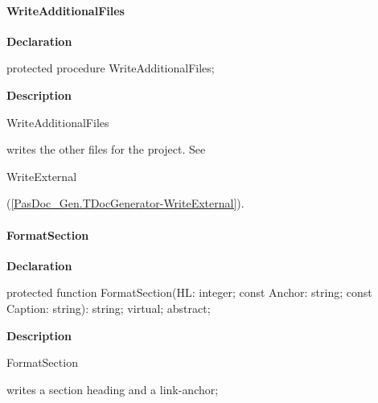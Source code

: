 \documentclass{report}
\newif\ifpdf
\begin{document}
\paragraph*{WriteAdditionalFiles}\hspace*{\fill}

\label{PasDoc_Gen.TDocGenerator-WriteAdditionalFiles}
\begin{list}{}{
\setlength{\itemindent}{0cm}
\setlength{\listparindent}{0cm}
\setlength{\leftmargin}{\evensidemargin}
\addtolength{\leftmargin}{\tmplength}
\settowidth{\labelsep}{X}
\addtolength{\leftmargin}{\labelsep}
\setlength{\labelwidth}{\tmplength}
}
\item[\textbf{Declaration}\hfill]
\ifpdf
\begin{flushleft}
\fi
\begin{ttfamily}
protected procedure WriteAdditionalFiles;\end{ttfamily}

\ifpdf
\end{flushleft}
\fi

\par
\item[\textbf{Description}]
\begin{ttfamily}WriteAdditionalFiles\end{ttfamily} writes the other files for the project. See \begin{ttfamily}WriteExternal\end{ttfamily}(\ref{PasDoc_Gen.TDocGenerator-WriteExternal}).

\end{list}
\paragraph*{FormatSection}\hspace*{\fill}

\label{PasDoc_Gen.TDocGenerator-FormatSection}
\begin{list}{}{
\setlength{\itemindent}{0cm}
\setlength{\listparindent}{0cm}
\setlength{\leftmargin}{\evensidemargin}
\addtolength{\leftmargin}{\tmplength}
\settowidth{\labelsep}{X}
\addtolength{\leftmargin}{\labelsep}
\setlength{\labelwidth}{\tmplength}
}
\item[\textbf{Declaration}\hfill]
\ifpdf
\begin{flushleft}
\fi
\begin{ttfamily}
protected function FormatSection(HL: integer; const Anchor: string; const Caption: string): string; virtual; abstract;\end{ttfamily}

\ifpdf
\end{flushleft}
\fi

\par
\item[\textbf{Description}]
\begin{ttfamily}FormatSection\end{ttfamily} writes a section heading and a link{-}anchor;

\end{list}
\end{document}
